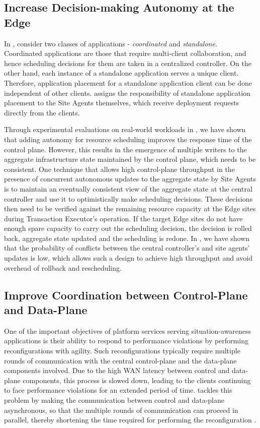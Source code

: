 \subsection{Increase Decision-making Autonomy at the Edge}
In \oneedge{}, consider two classes of applications - \textit{coordinated} and \textit{standalone}. Coordinated applications are those that require multi-client collaboration, and hence scheduling decisions for them are taken in a centralized controller. On the other hand, each instance of a standalone application serves a unique client. Therefore, application placement for a standalone application client can be done independent of other clients. \oneedge{} assigns the responsibility of standalone application placement to the Site Agents themselves, which receive deployment requests directly from the clients. 
\par Through experimental evaluations on real-world workloads in \cite{oneedge}, we have shown that adding autonomy for resource scheduling improves the response time of the control plane. However, this results in the emergence of multiple writers to the aggregate infrastructure state maintained by the control plane, which needs to be consistent. One technique that allows high control-plane throughput in the presence of concurrent autonomous updates to the aggregate state by Site Agents is to maintain an eventually consistent view of the aggregate state at the central controller and use it to optimistically make scheduling decisions. These decisions then need to be verified against the remaining resource capacity at the Edge sites during Transaction Executor's operation. If the target Edge sites do not have enough spare capacity to carry out the scheduling decision, the decision is rolled back, aggregate state updated and the scheduling is redone. In \cite{oneedge}, we have shown that the probability of conflicts between the central controller's and site agents' updates is low, which allows such a design to achieve high throughput and avoid overhead of rollback and rescheduling.

\subsection{Improve Coordination between Control-Plane and Data-Plane}
One of the important objectives of platform services serving situation-awareness applications is their ability to respond to performance violations by performing reconfigurations with agility. Such reconfigurations typically require multiple rounds of communication with the central control-plane and the data-plane components involved. Due to the high WAN latency between control and data-plane components, this process is slowed down, leading to the clients continuing to face performance violations for an extended period of time. \epulsar{} tackles this problem by making the communication between control and data-plane asynchronous, so that the multiple rounds of communication can proceed in parallel, thereby shortening the time required for performing the reconfiguration \cite{epulsar}.

